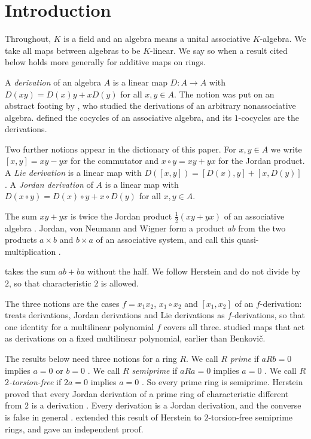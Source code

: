 \documentclass[]{interact}
\theoremstyle{plain}
\theoremstyle{definition}
\theoremstyle{remark}
\begin{document}
\section{Introduction}\label{sec:intro}

Throughout, $K$ is a field and an algebra means a unital associative $K$-algebra.
We take all maps between algebras to be $K$-linear.
We say so when a result cited below holds more generally for additive maps on rings.

A \emph{derivation} of an algebra $A$ is a linear map $D \colon A \to A$ with $D(xy) = D(x)y + xD(y)$ for all $x, y \in A$.
The notion was put on an abstract footing by \citet[Part I]{Jacobson1937}, who studied the derivations of an arbitrary nonassociative algebra.
\citet[\S\S2 and 4]{Hochschild1945} defined the cocycles of an associative algebra, and its $1$-cocycles are the derivations.

Two further notions appear in the dictionary of this paper. %
For $x, y \in A$ we write $[x,y] = xy - yx$ for the commutator and $x \circ y = xy + yx$ for the Jordan product.
A \emph{Lie derivation} is a linear map with $D([x,y]) = [D(x), y] + [x, D(y)]$ \citep[p.~183]{Martindale1964}.
A \emph{Jordan derivation} of $A$ is a linear map with $D(x \circ y) = D(x) \circ y + x \circ D(y)$ for all $x, y \in A$.

The sum $xy + yx$ is twice the Jordan product $\tfrac12 (xy + yx)$ of an associative algebra \citep[Example 2.1]{BresarZelmanov2025}.
Jordan, von Neumann and Wigner form a product $ab$ from the two products $a \times b$ and $b \times a$ of an associative system, and call this quasi-multiplication \citep[p.~64]{JordanVonNeumannWigner1934}.

\citet[p.~1104]{Herstein1957} takes the sum $ab + ba$ without the half.
We follow Herstein and do not divide by $2$, so that characteristic $2$ is allowed.

The three notions are the cases $f = x_1x_2$, $x_1 \circ x_2$ and $[x_1, x_2]$ of an $f$-derivation: \citet[\S1]{Benkovic2015} treats derivations, Jordan derivations and Lie derivations as $f$-derivations, so that one identity for a multilinear polynomial $f$ covers all three.
\citet[Theorem 4.3]{BeidarBresarChebotarMartindale2001} studied maps that act as derivations on a fixed multilinear polynomial, earlier than Benkovi\v{c}.

The results below need three notions for a ring $R$. %
We call $R$ \emph{prime} if $aRb = 0$ implies $a = 0$ or $b = 0$ \citep[p.~1003]{Bresar1988}.
We call $R$ \emph{semiprime} if $aRa = 0$ implies $a = 0$ \citep[p.~1003]{Bresar1988}.
We call $R$ \emph{$2$-torsion-free} if $2a = 0$ implies $a = 0$ \citep[p.~1003]{Bresar1988}.
So every prime ring is semiprime.
Herstein proved that every Jordan derivation of a prime ring of characteristic different from $2$ is a derivation \citep[Theorem 3.1]{Herstein1957}.
Every derivation is a Jordan derivation, and the converse is false in general \citep[p.~1003]{Bresar1988}.
\citet[Corollary 5]{Cusack1975} extended this result of Herstein to $2$-torsion-free semiprime rings, and \citet[Theorem 1]{Bresar1988} gave an independent proof.
\end{document}
